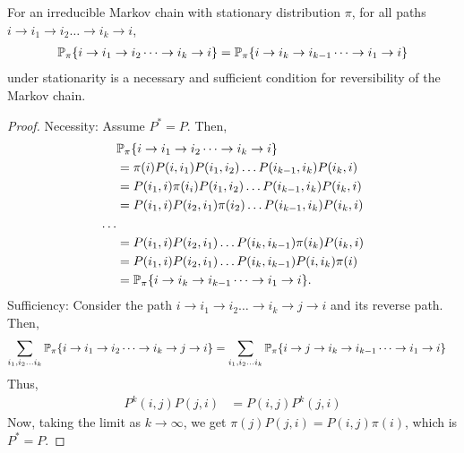 \documentclass[all-lectures.tex]{subfiles}
\begin{document}
\begin{prop}
For an irreducible Markov chain with stationary distribution $\pi$,  for all paths $i\rightarrow i_1 \rightarrow i_2 \dots \rightarrow i_k \rightarrow i$,
\begin{align*}
\P_\pi\{i\rightarrow i_1 \rightarrow i_2 \dots \rightarrow i_k \rightarrow i\} = \P_\pi\{i \rightarrow i_k \rightarrow i_{k-1} \dots \rightarrow i_1 \rightarrow i\}
\end{align*}
under stationarity is a necessary and sufficient condition for reversibility of the Markov chain. 
\begin{proof}
Necessity: Assume $P^* = P$. Then, 
\begin{align*}
&\P_\pi\{i\rightarrow i_1 \rightarrow i_2 \dots \rightarrow i_k \rightarrow i\} \\
&= \pi(i)P(i,i_1)P(i_1,i_2)\dots P(i_{k-1},i_{k})P(i_k,i)\\
& = P(i_1,i)\pi(i_i) P(i_1,i_2)\dots P(i_{k-1},i_{k})P(i_k,i) \\
& = P(i_1,i)P(i_2,i_1)\pi(i_2) \dots P(i_{k-1},i_{k})P(i_k,i) \\
\dots \\
& = P(i_1,i)P(i_2,i_1) \dots P(i_{k},i_{k-1})\pi(i_k)P(i_k,i) \\
& = P(i_1,i)P(i_2,i_1) \dots P(i_{k},i_{k-1})P(i,i_k)\pi(i) \\
&= \P_\pi\{i \rightarrow i_k \rightarrow i_{k-1} \dots \rightarrow i_1 \rightarrow i\}.
\end{align*}
Sufficiency: Consider the path $i\rightarrow i_1 \rightarrow i_2 \dots \rightarrow i_k \rightarrow j\rightarrow i$ and its reverse path. Then, 
\begin{align*}
\sum_{i_1,i_2\dots i_k}\P_\pi\{i\rightarrow i_1 \rightarrow i_2 \dots \rightarrow i_k \rightarrow j \rightarrow i\} &= \sum_{i_1,i_2\dots i_k}\P_\pi\{i \rightarrow j \rightarrow i_k \rightarrow i_{k-1} \dots \rightarrow i_1 \rightarrow i\} 
\end{align*}
Thus, 
\begin{align*}
P^{k}(i,j)P(j,i) &= P(i,j)P^{k}(j,i)
\end{align*}
Now, taking the limit as $k\rightarrow \infty$, we get $\pi(j)P(j,i) = P(i,j)\pi(i)$, which is $P^* = P$.
\end{proof}
\end{prop}
\end{document}
